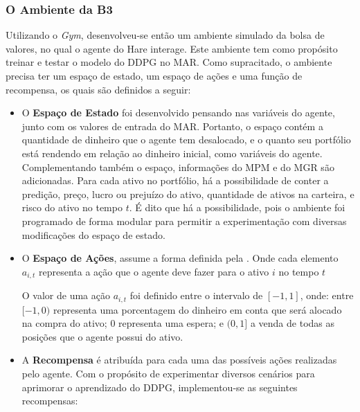 \subsubsection{O Ambiente da B3}

Utilizando o \emph{Gym}, desenvolveu-se então um ambiente simulado da bolsa de valores, no qual o agente do Hare interage. Este ambiente tem como propósito treinar e testar o modelo do \acrshort{DDPG} no \acrshort{MAR}. Como supracitado, o ambiente precisa ter um espaço de estado, um espaço de ações e uma função de recompensa, os quais são definidos a seguir:

\begin{itemize}
    \item O \textbf{Espaço de Estado} foi desenvolvido pensando nas variáveis do agente, junto com os valores de entrada do \acrshort{MAR}. Portanto, o espaço contém a quantidade de dinheiro que o agente tem desalocado, e o quanto seu portfólio está rendendo em relação ao dinheiro inicial, como variáveis do agente. Complementando também o espaço, informações do \acrshort{MPM} e do \acrshort{MGR} são adicionadas. Para cada ativo no portfólio, há a possibilidade de conter a predição, preço, lucro ou prejuízo do ativo, quantidade de ativos na carteira, e risco do ativo no tempo $t$. É dito que há a possibilidade, pois o ambiente foi programado de forma modular para permitir a experimentação com diversas modificações do espaço de estado.
    
    \item O \textbf{Espaço de Ações}, assume a forma definida pela . Onde cada elemento $a_{i,t}$ representa a ação que o agente deve fazer para o ativo $i$ no tempo $t$

    
    O valor de uma ação $a_{i,t}$ foi definido entre o intervalo de $[-1, 1]$, onde: entre $[-1, 0)$ representa uma porcentagem do dinheiro em conta que será alocado na compra do ativo; $0$ representa uma espera; e $(0, 1]$ a venda de todas as posições que o agente possui do ativo.
    
    \item A \textbf{Recompensa} é atribuída para cada uma das possíveis ações realizadas pelo agente. Com o propósito de experimentar diversos cenários para aprimorar o aprendizado do \acrshort{DDPG}, implementou-se as seguintes recompensas:
        

\end{itemize}
